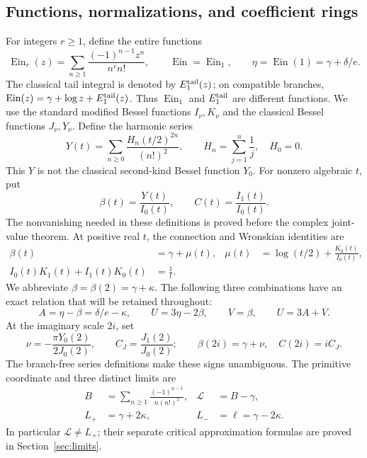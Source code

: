\documentclass[11pt]{article}
\theoremstyle{definition}
\theoremstyle{remark}
\newcommand{\Ein}{\operatorname{Ein}}
\begin{document}
\subsection{Functions, normalizations, and coefficient rings}
For integers $r\ge1$, define the entire functions
\[
 \Ein_r(z)=\sum_{n\ge1}\frac{(-1)^{n-1}z^n}{n^r n!},
 \qquad \Ein=\Ein_1,\qquad \eta=\Ein(1)=\gamma+\delta/e.
\]
The classical tail integral is denoted by $E_1^{\rm tail}(z)$;
on compatible branches,
$\Ein(z)=\gamma+\log z+E_1^{\rm tail}(z)$.
Thus $\Ein_1$ and $E_1^{\rm tail}$ are different functions.
We use the standard modified Bessel functions $I_\nu,K_\nu$ and the
classical Bessel functions $J_\nu,Y_\nu$. Define the harmonic series
\begin{equation}\label{eq:Y}
 Y(t)=\sum_{n\ge0}\frac{H_n(t/2)^{2n}}{(n!)^2},
 \qquad H_n=\sum_{j=1}^n\frac1j,\quad H_0=0.
\end{equation}
This $Y$ is not the classical second-kind Bessel function $Y_0$.
For nonzero algebraic $t$, put
\[
 \beta(t)=\frac{Y(t)}{I_0(t)},\qquad C(t)=\frac{I_1(t)}{I_0(t)}.
\]
The nonvanishing needed in these definitions is proved before the complex
joint-value theorem. At positive real $t$, the connection and Wronskian
identities are
\begin{align}
 \beta(t)&=\gamma+\mu(t),&
 \mu(t)&=\log(t/2)+\frac{K_0(t)}{I_0(t)},\label{eq:beta}\\
 I_0(t)K_1(t)+I_1(t)K_0(t)&=\frac1t.&&\label{eq:wronskian}
\end{align}
We abbreviate $\beta=\beta(2)=\gamma+\kappa$. The following three
combinations have an exact relation that will be retained throughout:
\begin{equation}\label{eq:coordinates}
 A=\eta-\beta=\delta/e-\kappa,\qquad
 U=3\eta-2\beta,\qquad V=\beta,\qquad U=3A+V.
\end{equation}
At the imaginary scale $2i$, set
\[
 \nu=-\frac{\pi Y_0(2)}{2J_0(2)},\qquad
 C_J=\frac{J_1(2)}{J_0(2)};
 \qquad \beta(2i)=\gamma+\nu,\quad C(2i)=iC_J.
\]
The branch-free series definitions make these signs unambiguous.
The primitive coordinate and three distinct limits are
\begin{align*}
 B&=\sum_{n\ge1}\frac{(-1)^{n-1}}{n(n!)^2},&
 \mathcal L&=B-\gamma,\\
 L_+&=\gamma+2\kappa,& L_-&=\ell=\gamma-2\kappa.
\end{align*}
In particular $\mathcal L\ne L_+$; their separate critical approximation
formulas are proved in Section~\ref{sec:limits}.
\end{document}
